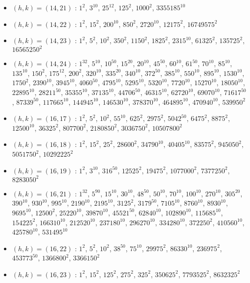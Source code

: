 \begin{itemize}
\item $(h,k)=(14,21)$ : $1^{2}$, $3^{10}$, $25^{12}$, $125^{2}$, $1000^{2}$, $3355185^{10}$
\item $(h,k)=(14,22)$ : $1^{2}$, $15^{2}$, $200^{10}$, $850^{2}$, $2720^{10}$, $12175^{2}$, $16749575^{2}$
\item $(h,k)=(14,23)$ : $1^{2}$, $5^{2}$, $10^{2}$, $350^{2}$, $1150^{2}$, $1825^{2}$, $2315^{10}$, $61325^{2}$, $135725^{2}$, $16565250^{2}$
\item $(h,k)=(14,24)$ : $1^{32}$, $5^{10}$, $10^{50}$, $15^{20}$, $20^{10}$, $45^{50}$, $60^{10}$, $61^{50}$, $70^{10}$, $85^{10}$, $135^{10}$, $150^{2}$, $175^{12}$, $200^{2}$, $320^{10}$, $335^{20}$, $340^{10}$, $372^{50}$, $385^{10}$, $550^{10}$, $895^{10}$, $1530^{10}$, $1750^{2}$, $2390^{10}$, $3945^{10}$, $4060^{50}$, $4795^{10}$, $5295^{10}$, $5320^{10}$, $7720^{10}$, $15270^{10}$, $18050^{10}$, $22895^{10}$, $28211^{50}$, $35355^{10}$, $37135^{10}$, $44706^{50}$, $46315^{10}$, $62720^{10}$, $69070^{10}$, $71617^{50}$, $87339^{50}$, $117665^{10}$, $144945^{10}$, $146530^{10}$, $378370^{10}$, $464895^{10}$, $470940^{10}$, $539950^{2}$
\item $(h,k)=(16,17)$ : $1^{2}$, $5^{2}$, $10^{2}$, $55^{10}$, $625^{2}$, $2975^{2}$, $5042^{50}$, $6475^{2}$, $8875^{2}$, $12500^{10}$, $36325^{2}$, $807700^{2}$, $2180850^{2}$, $3036750^{2}$, $10507800^{2}$
\item $(h,k)=(16,18)$ : $1^{2}$, $15^{2}$, $25^{2}$, $28600^{2}$, $34790^{10}$, $40405^{10}$, $83575^{2}$, $945050^{2}$, $5051750^{2}$, $10292225^{2}$
\item $(h,k)=(16,19)$ : $1^{2}$, $3^{10}$, $316^{50}$, $12525^{2}$, $19475^{2}$, $1077000^{2}$, $7377250^{2}$, $8283050^{2}$
\item $(h,k)=(16,21)$ : $1^{32}$, $5^{90}$, $15^{10}$, $30^{10}$, $48^{50}$, $50^{10}$, $70^{10}$, $100^{10}$, $270^{10}$, $305^{20}$, $390^{10}$, $930^{10}$, $995^{10}$, $2190^{10}$, $2195^{10}$, $3125^{2}$, $3179^{50}$, $7105^{10}$, $8760^{10}$, $8930^{10}$, $9695^{10}$, $12500^{2}$, $25220^{10}$, $39870^{10}$, $45521^{50}$, $62840^{10}$, $102890^{10}$, $115685^{10}$, $154225^{2}$, $166310^{10}$, $212520^{10}$, $237180^{10}$, $296270^{10}$, $334280^{10}$, $372250^{2}$, $410560^{10}$, $425780^{10}$, $531495^{10}$
\item $(h,k)=(16,22)$ : $1^{2}$, $5^{2}$, $10^{2}$, $38^{50}$, $75^{10}$, $29975^{2}$, $86330^{10}$, $236975^{2}$, $453773^{50}$, $1366800^{2}$, $3366150^{2}$
\item $(h,k)=(16,23)$ : $1^{2}$, $15^{2}$, $125^{2}$, $275^{2}$, $325^{2}$, $350625^{2}$, $7793525^{2}$, $8632325^{2}$

\end{itemize}
